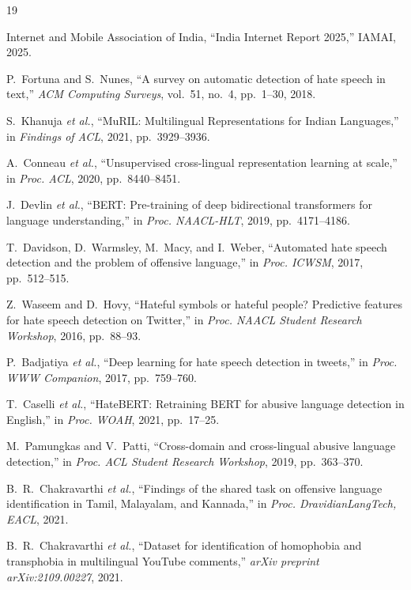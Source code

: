 \documentclass[conference]{IEEEtran}
\begin{document}
\begin{thebibliography}{19}

Internet and Mobile Association of India, ``India Internet Report 2025,'' IAMAI, 2025.

P.~Fortuna and S.~Nunes, ``A survey on automatic detection of hate speech in text,'' \textit{ACM Computing Surveys}, vol.~51, no.~4, pp.~1--30, 2018.

S.~Khanuja \textit{et al.}, ``MuRIL: Multilingual Representations for Indian Languages,'' in \textit{Findings of ACL}, 2021, pp.~3929--3936.

A.~Conneau \textit{et al.}, ``Unsupervised cross-lingual representation learning at scale,'' in \textit{Proc. ACL}, 2020, pp.~8440--8451.

J.~Devlin \textit{et al.}, ``BERT: Pre-training of deep bidirectional transformers for language understanding,'' in \textit{Proc. NAACL-HLT}, 2019, pp.~4171--4186.

T.~Davidson, D.~Warmsley, M.~Macy, and I.~Weber, ``Automated hate speech detection and the problem of offensive language,'' in \textit{Proc. ICWSM}, 2017, pp.~512--515.

Z.~Waseem and D.~Hovy, ``Hateful symbols or hateful people? Predictive features for hate speech detection on Twitter,'' in \textit{Proc. NAACL Student Research Workshop}, 2016, pp.~88--93.

P.~Badjatiya \textit{et al.}, ``Deep learning for hate speech detection in tweets,'' in \textit{Proc. WWW Companion}, 2017, pp.~759--760.

T.~Caselli \textit{et al.}, ``HateBERT: Retraining BERT for abusive language detection in English,'' in \textit{Proc. WOAH}, 2021, pp.~17--25.

M.~Pamungkas and V.~Patti, ``Cross-domain and cross-lingual abusive language detection,'' in \textit{Proc. ACL Student Research Workshop}, 2019, pp.~363--370.

B.~R.~Chakravarthi \textit{et al.}, ``Findings of the shared task on offensive language identification in Tamil, Malayalam, and Kannada,'' in \textit{Proc. DravidianLangTech, EACL}, 2021.

B.~R.~Chakravarthi \textit{et al.}, ``Dataset for identification of homophobia and transphobia in multilingual YouTube comments,'' \textit{arXiv preprint arXiv:2109.00227}, 2021.


\end{thebibliography}
\end{document}

